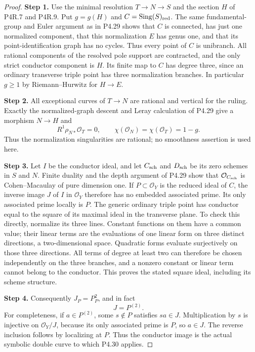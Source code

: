 \begin{proof}
\noindent\textbf{Step 1.} Use the minimal resolution $T\to N\to S$ and the section $H$
of P4R.7 and P4R.9. Put $g=g(H)$ and
$C=\operatorname{Sing}(S)_{\rm red}$.
The same fundamental-group and Euler argument as in P4.29
shows that $C$ is connected, has just one normalized
component, that this normalization $E$ has genus one, and
that its point-identification graph has no cycles. Thus
every point of $C$ is unibranch. All rational components
of the resolved pole support are contracted, and the
only strict conductor component is $H$. Its finite map
to $C$ has degree three, since an ordinary transverse
triple point has three normalization branches.
In particular $g\ge1$ by Riemann--Hurwitz for $H\to E$.

\noindent\textbf{Step 2.} All exceptional curves of $T\to N$ are rational and
vertical for the ruling. Exactly the normalized-graph
descent and Leray calculation of P4.29 give a morphism
$N\to H$ and
\[
 R^1\rho_{N*}\mathcal O_T=0,\qquad
 \chi(\mathcal O_N)=\chi(\mathcal O_T)=1-g.
\]
Thus the normalization singularities are rational; no
smoothness assertion is used here.

\noindent\textbf{Step 3.} Let $I$ be the conductor ideal, and let $C_{\rm sch}$
and $D_{\rm sch}$ be its zero schemes in $S$ and $N$.
Finite duality and the depth argument of P4.29 show that
$\mathcal O_{C_{\rm sch}}$ is Cohen--Macaulay of pure
dimension one. If $P\subset\mathcal O_Y$ is the reduced
ideal of $C$, the inverse image $J$ of $I$ in
$\mathcal O_Y$ therefore has no embedded associated
prime. Its only associated prime locally is $P$.
The generic ordinary triple point has conductor equal
to the square of its maximal ideal in the transverse
plane. To check this directly, normalize its three
lines. Constant functions on them have a common value;
their linear terms are the evaluations of one linear
form on three distinct directions, a two-dimensional
space. Quadratic forms evaluate surjectively on those
three directions. All terms of degree at least two
can therefore be chosen independently on the three
branches, and a nonzero constant or linear term cannot
belong to the conductor. This proves the stated square
ideal, including its scheme structure.

\noindent\textbf{Step 4.} Consequently $J_P=P_P^2$, and in fact
\[
 J=P^{(2)}.
\]
For completeness, if $a\in P^{(2)}$, some $s\notin P$
satisfies $sa\in J$. Multiplication by $s$ is injective
on $\mathcal O_Y/J$, because its only associated prime
is $P$, so $a\in J$. The reverse inclusion follows by
localizing at $P$. Thus the conductor image is the
actual symbolic double curve to which P4.30 applies.


\end{proof}
